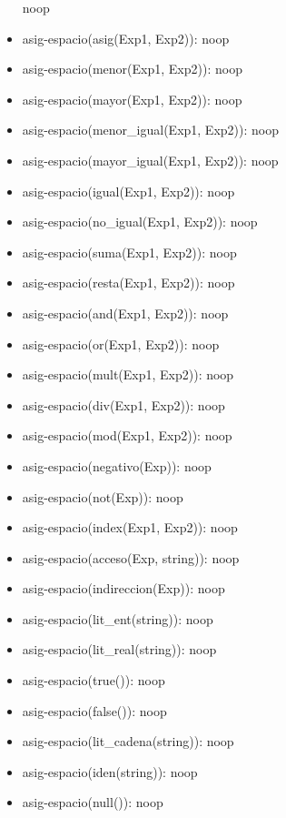 \documentclass[11pt]{article}
\begin{document}
\begin{itemize}
                \subitem noop
            \item asig-espacio(asig(Exp1, Exp2)): 
                \subitem noop
            \item asig-espacio(menor(Exp1, Exp2)): 
                \subitem noop
            \item asig-espacio(mayor(Exp1, Exp2)): 
                \subitem noop
            \item asig-espacio(menor\_igual(Exp1, Exp2)): 
                \subitem noop
            \item asig-espacio(mayor\_igual(Exp1, Exp2)): 
                \subitem noop
            \item asig-espacio(igual(Exp1, Exp2)): 
                \subitem noop
            \item asig-espacio(no\_igual(Exp1, Exp2)): 
                \subitem noop
            \item asig-espacio(suma(Exp1, Exp2)): 
                \subitem noop
            \item asig-espacio(resta(Exp1, Exp2)): 
                \subitem noop
            \item asig-espacio(and(Exp1, Exp2)): 
                \subitem noop
            \item asig-espacio(or(Exp1, Exp2)): 
                \subitem noop
            \item asig-espacio(mult(Exp1, Exp2)): 
                \subitem noop
            \item asig-espacio(div(Exp1, Exp2)): 
                \subitem noop
            \item asig-espacio(mod(Exp1, Exp2)): 
                \subitem noop
            \item asig-espacio(negativo(Exp)): 
                \subitem noop
            \item asig-espacio(not(Exp)): 
                \subitem noop
            \item asig-espacio(index(Exp1, Exp2)): 
                \subitem noop
            \item asig-espacio(acceso(Exp, string)): 
                \subitem noop
            \item asig-espacio(indireccion(Exp)): 
                \subitem noop
            \item asig-espacio(lit\_ent(string)): 
                \subitem noop
            \item asig-espacio(lit\_real(string)): 
                \subitem noop
            \item asig-espacio(true()): 
                \subitem noop
            \item asig-espacio(false()): 
                \subitem noop
            \item asig-espacio(lit\_cadena(string)): 
                \subitem noop
            \item asig-espacio(iden(string)): 
                \subitem noop
            \item asig-espacio(null()): 
                \subitem noop
        \end{itemize}
    
\end{document}
